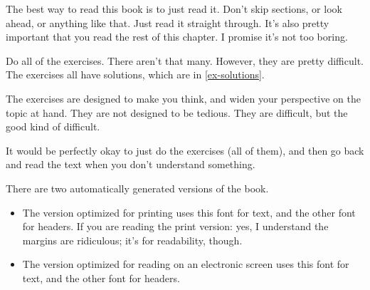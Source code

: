 
The best way to read this book is to just read it. Don't skip sections,
or look ahead, or anything like that. Just read it straight
through. It's also pretty important that you read the rest of this
chapter. I promise it's not too boring.

Do all of the exercises. There aren't that many. However, they are
pretty difficult. The exercises all have solutions, which are in
\cref{ex-solutions}.

The exercises are designed to make you think, and widen your perspective
on the topic at hand. They are not designed to be tedious. They are
difficult, but the good kind of difficult.

It would be perfectly okay to just do the exercises (all of them), and
then go back and read the text when you don't understand something.

There are two automatically generated versions of the book.

\begin{itemize}
  \item {\rmfamily The version optimized for printing uses this font for text,
      and the other font for headers.} If you are reading the print version:
    yes, I understand the margins are ridiculous; it's for readability, though.
  \item {\sffamily The version optimized for reading on an electronic screen
      uses this font for text, and the other font for headers.}
\end{itemize}
